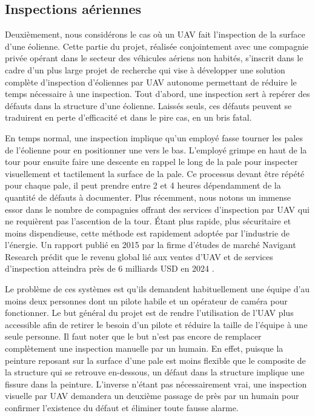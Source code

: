 \subsection{Inspections aériennes}
Deuxièmement, nous considérons le cas où un UAV fait l'inspection de la surface d'une éolienne. Cette partie du projet, réalisée conjointement avec une compagnie privée opérant dans le secteur des véhicules aériens non habités,
s'inscrit dans le cadre d'un plus large projet de recherche qui vise à développer une solution complète d'inspection d'éoliennes par UAV autonome permettant de réduire le temps nécessaire à une inspection. Tout d'abord, une inspection sert à repérer des défauts dans la structure d'une éolienne. Laissés seuls, ces défauts peuvent se traduirent en perte d'efficacité et dans le pire cas, en un bris fatal.

En temps normal, une inspection implique qu'un employé fasse tourner les pales de l'éolienne pour en positionner une vers le bas. L'employé grimpe en haut de la tour pour ensuite faire une descente en rappel le long de la pale pour inspecter visuellement et tactilement la surface de la pale. Ce processus devant être répété pour chaque pale, il peut prendre entre 2 et 4 heures dépendamment de la quantité de défauts à documenter. Plus récemment, nous notons un immense essor dans le nombre de compagnies offrant des services d'inspection par UAV qui ne requièrent pas l'ascention de la tour. Étant plus rapide, plus sécuritaire et moins dispendieuse, cette méthode est rapidement adoptée par l'industrie de l'énergie. Un rapport publié en 2015 par la firme d'études de marché Navigant Research prédit que le revenu global lié aux ventes d'UAV et de services d'inspection atteindra près de 6 milliards USD en 2024 \citep{navigant2015}.

Le problème de ces systèmes est qu'ils demandent habituellement une équipe d'au moins deux personnes dont un pilote habile et un opérateur de caméra pour fonctionner. Le but général du projet est de rendre l'utilisation de l'UAV plus accessible afin de retirer le besoin d'un pilote et réduire la taille de l'équipe à une seule personne. Il faut noter que le but n'est pas encore de remplacer complètement une inspection manuelle par un humain. En effet, puisque la peinture reposant sur la surface d'une pale est moins flexible que le composite de la structure qui se retrouve en-dessous, un défaut dans la structure implique une fissure dans la peinture. L'inverse n'étant pas nécessairement vrai, une inspection visuelle par UAV demandera un deuxième passage de près par un humain pour confirmer l'existence du défaut et éliminer toute fausse alarme.


